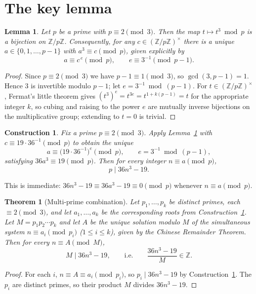 \documentclass[11pt]{article}
\newtheorem{theorem}{Theorem}
\newtheorem{lemma}{Lemma}
\newtheorem{construction}{Construction}
\begin{document}
\section{The key lemma}

\begin{lemma}\label{lem:cuberoot}
Let $p$ be a prime with $p\equiv 2\pmod 3$. Then the map $t\mapsto t^3 \bmod p$
is a bijection on $\mathbb{Z}/p\mathbb{Z}$. Consequently, for any $c\in(\mathbb Z/p\mathbb Z)^\times$
there is a unique $a\in\{0,1,\dots,p-1\}$ with $a^3\equiv c\pmod p$, given
explicitly by
\[
  a \equiv c^{\,e}\pmod p,\qquad e \equiv 3^{-1}\pmod{p-1}.
\]
\end{lemma}

\begin{proof}
Since $p\equiv 2\pmod 3$ we have $p-1\equiv 1\pmod 3$, so $\gcd(3,p-1)=1$.
Hence $3$ is invertible modulo $p-1$; let $e=3^{-1}\bmod (p-1)$. For
$t\in(\mathbb Z/p\mathbb Z)^\times$, Fermat's little theorem gives
$(t^3)^e = t^{3e} = t^{1+k(p-1)} = t$ for the appropriate integer $k$, so
cubing and raising to the power $e$ are mutually inverse bijections on the
multiplicative group; extending to $t=0$ is trivial.
\end{proof}

\begin{construction}\label{con:main}
Fix a prime $p\equiv 2\pmod 3$. Apply Lemma~\ref{lem:cuberoot} with
$c \equiv 19\cdot 36^{-1}\pmod p$ to obtain the unique
\[
  a \equiv \bigl(19\cdot 36^{-1}\bigr)^{e}\pmod p, \qquad e=3^{-1}\bmod (p-1),
\]
satisfying $36a^3\equiv 19\pmod p$. Then for \emph{every} integer $n\equiv a\pmod p$,
\[
  p \mid 36n^3-19.
\]
\end{construction}

This is immediate: $36n^3-19\equiv 36a^3-19\equiv 0\pmod p$ whenever $n\equiv a\pmod p$.

\begin{theorem}[Multi-prime combination]\label{thm:crt}
Let $p_1,\dots,p_k$ be distinct primes, each $\equiv 2\pmod 3$, and let
$a_1,\dots,a_k$ be the corresponding roots from Construction~\ref{con:main}.
Let $M=p_1p_2\cdots p_k$ and let $A$ be the unique solution modulo $M$ of the
simultaneous system $n\equiv a_i \pmod{p_i}$ ($1\le i\le k$), given by the
Chinese Remainder Theorem. Then for every $n\equiv A\pmod M$,
\[
  M \mid 36n^3-19, \qquad\text{i.e.}\qquad \frac{36n^3-19}{M}\in\mathbb Z .
\]
\end{theorem}

\begin{proof}
For each $i$, $n\equiv A\equiv a_i\pmod{p_i}$, so $p_i\mid 36n^3-19$ by
Construction~\ref{con:main}. The $p_i$ are distinct primes, so their product
$M$ divides $36n^3-19$.
\end{proof}
\end{document}
